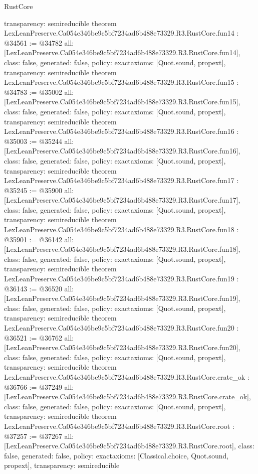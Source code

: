 \begin{lexlean}{RustCore}
\begin{coremodule}
{  transparency: semireducible
}
theorem LexLeanPreserve.Ca054e346be9c5bf7234ad6b488e73329.R3.RustCore.fun14 : @34561 := @34782 {
  all: [LexLeanPreserve.Ca054e346be9c5bf7234ad6b488e73329.R3.RustCore.fun14],
  class: false,
  generated: false,
  policy: exact{axioms: [Quot.sound, propext]},
  transparency: semireducible
}
theorem LexLeanPreserve.Ca054e346be9c5bf7234ad6b488e73329.R3.RustCore.fun15 : @34783 := @35002 {
  all: [LexLeanPreserve.Ca054e346be9c5bf7234ad6b488e73329.R3.RustCore.fun15],
  class: false,
  generated: false,
  policy: exact{axioms: [Quot.sound, propext]},
  transparency: semireducible
}
theorem LexLeanPreserve.Ca054e346be9c5bf7234ad6b488e73329.R3.RustCore.fun16 : @35003 := @35244 {
  all: [LexLeanPreserve.Ca054e346be9c5bf7234ad6b488e73329.R3.RustCore.fun16],
  class: false,
  generated: false,
  policy: exact{axioms: [Quot.sound, propext]},
  transparency: semireducible
}
theorem LexLeanPreserve.Ca054e346be9c5bf7234ad6b488e73329.R3.RustCore.fun17 : @35245 := @35900 {
  all: [LexLeanPreserve.Ca054e346be9c5bf7234ad6b488e73329.R3.RustCore.fun17],
  class: false,
  generated: false,
  policy: exact{axioms: [Quot.sound, propext]},
  transparency: semireducible
}
theorem LexLeanPreserve.Ca054e346be9c5bf7234ad6b488e73329.R3.RustCore.fun18 : @35901 := @36142 {
  all: [LexLeanPreserve.Ca054e346be9c5bf7234ad6b488e73329.R3.RustCore.fun18],
  class: false,
  generated: false,
  policy: exact{axioms: [Quot.sound, propext]},
  transparency: semireducible
}
theorem LexLeanPreserve.Ca054e346be9c5bf7234ad6b488e73329.R3.RustCore.fun19 : @36143 := @36520 {
  all: [LexLeanPreserve.Ca054e346be9c5bf7234ad6b488e73329.R3.RustCore.fun19],
  class: false,
  generated: false,
  policy: exact{axioms: [Quot.sound, propext]},
  transparency: semireducible
}
theorem LexLeanPreserve.Ca054e346be9c5bf7234ad6b488e73329.R3.RustCore.fun20 : @36521 := @36762 {
  all: [LexLeanPreserve.Ca054e346be9c5bf7234ad6b488e73329.R3.RustCore.fun20],
  class: false,
  generated: false,
  policy: exact{axioms: [Quot.sound, propext]},
  transparency: semireducible
}
theorem LexLeanPreserve.Ca054e346be9c5bf7234ad6b488e73329.R3.RustCore.crate_ok : @36766 := @37249 {
  all: [LexLeanPreserve.Ca054e346be9c5bf7234ad6b488e73329.R3.RustCore.crate_ok],
  class: false,
  generated: false,
  policy: exact{axioms: [Quot.sound, propext]},
  transparency: semireducible
}
theorem LexLeanPreserve.Ca054e346be9c5bf7234ad6b488e73329.R3.RustCore.root : @37257 := @37267 {
  all: [LexLeanPreserve.Ca054e346be9c5bf7234ad6b488e73329.R3.RustCore.root],
  class: false,
  generated: false,
  policy: exact{axioms: [Classical.choice, Quot.sound, propext]},
  transparency: semireducible
}


\end{coremodule}
\end{lexlean}

